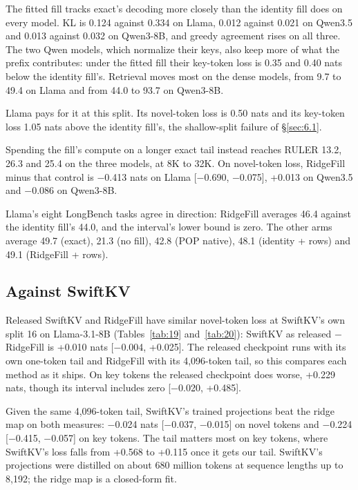 \documentclass[11pt]{article}
\begin{document}
The fitted fill tracks exact's decoding more closely than the identity fill does on every model. KL is 0.124 against 0.334 on Llama, 0.012 against 0.021 on Qwen3.5 and 0.013 against 0.032 on Qwen3-8B, and greedy agreement rises on all three. The two Qwen models, which normalize their keys, also keep more of what the prefix contributes: under the fitted fill their key-token loss is 0.35 and 0.40 nats below the identity fill's. Retrieval moves most on the dense models, from 9.7 to 49.4 on Llama and from 44.0 to 93.7 on Qwen3-8B.

Llama pays for it at this split. Its novel-token loss is 0.50 nats and its key-token loss 1.05 nats above the identity fill's, the shallow-split failure of \S\ref{sec:6.1}.

Spending the fill's compute on a longer exact tail instead reaches RULER 13.2, 26.3 and 25.4 on the three models, at 8K to 32K. On novel-token loss, RidgeFill minus that control is $-$0.413 nats on Llama [$-$0.690, $-$0.075], +0.013 on Qwen3.5 and $-$0.086 on Qwen3-8B.

Llama's eight LongBench tasks agree in direction: RidgeFill averages 46.4 against the identity fill's 44.0, and the interval's lower bound is zero. The other arms average 49.7 (exact), 21.3 (no fill), 42.8 (POP native), 48.1 (identity + rows) and 49.1 (RidgeFill + rows).


\subsection{Against SwiftKV}\label{sec:6.3}
Released SwiftKV and RidgeFill have similar novel-token loss at SwiftKV's own split 16 on Llama-3.1-8B (Tables~\ref{tab:19} and~\ref{tab:20}): SwiftKV as released $-$ RidgeFill is +0.010 nats [$-$0.004, +0.025]. The released checkpoint runs with its own one-token tail and RidgeFill with its 4,096-token tail, so this compares each method as it ships. On key tokens the released checkpoint does worse, +0.229 nats, though its interval includes zero [$-$0.020, +0.485].

Given the same 4,096-token tail, SwiftKV's trained projections beat the ridge map on both measures: $-$0.024 nats [$-$0.037, $-$0.015] on novel tokens and $-$0.224 [$-$0.415, $-$0.057] on key tokens. The tail matters most on key tokens, where SwiftKV's loss falls from +0.568 to +0.115 once it gets our tail. SwiftKV's projections were distilled on about 680 million tokens at sequence lengths up to 8,192; the ridge map is a closed-form fit.
\end{document}

